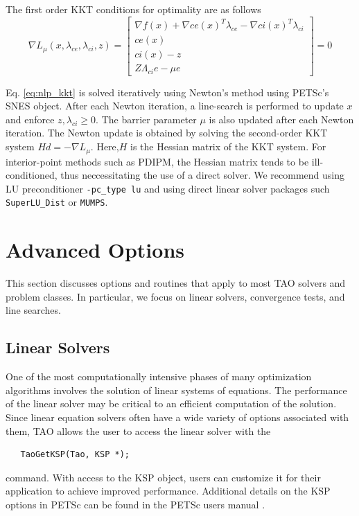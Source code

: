 \documentclass[]{book}
\begin{document}
The first order KKT conditions for optimality are as follows
\begin{equation}
\nabla L_{\mu}(x,\lambda_{ce},\lambda_{ci},z)    =
    \begin{bmatrix}
        \nabla f(x) + \nabla ce(x)^T\lambda_{ce} -  \nabla ci(x)^T \lambda_{ci} \\
        ce(x) \\
        ci(x) - z \\
        Z\Lambda_{ci}e - \mu e
    \end{bmatrix}
= 0
\label{eq:nlp_kkt}
\end{equation}

Eq. \ref{eq:nlp_kkt} is solved iteratively using Newton's method using PETSc's SNES object. After each Newton iteration, 
a line-search is performed to update $x$ and enforce $z,\lambda_{ci} \geq 0$. The barrier parameter $\mu$ is also updated
after each Newton iteration. The Newton update is obtained by solving the second-order KKT system $Hd = -\nabla L_{\mu}$. Here,$H$
is the Hessian matrix of the KKT system. For interior-point methods such as PDIPM, the Hessian matrix tends to be ill-conditioned,
thus neccessitating the use of a direct solver. We recommend using LU preconditioner {\tt -pc\_type lu} and using direct linear
solver packages such {\tt SuperLU\_Dist} or {\tt MUMPS}.



\chapter{Advanced Options}

This section discusses options and routines that apply to most TAO
solvers and problem classes.  In particular, we focus on
linear solvers, convergence tests, and line searches.

\section{Linear Solvers}\label{sec_TaoLinearSolvers}
One of the most computationally intensive phases of many optimization
algorithms involves the solution of linear systems of equations.  
The performance of the linear solver may be critical to an efficient 
computation of the solution.  Since linear equation solvers often have 
a wide variety of options associated with them, TAO allows the user to 
access the linear solver with the
\begin{verbatim}
   TaoGetKSP(Tao, KSP *);
\end{verbatim}
command. 
With access to the KSP object, users can customize it for their application
to achieve improved performance. Additional details on the KSP options in
PETSc can be found in the PETSc users manual \cite{petsc-user-ref}.
\end{document}
